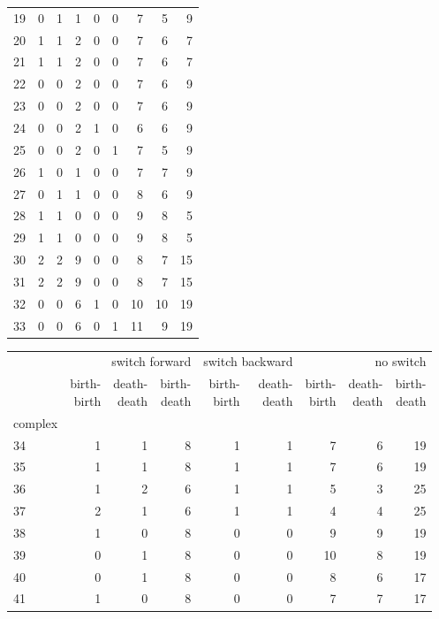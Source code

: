 \documentclass{article}
\begin{document}
\begin{center}
\begin{tabular}{lrrrrrrrr}
19 & 0 & 1 & 1 & 0 & 0 & 7 & 5 & 9 \\
20 & 1 & 1 & 2 & 0 & 0 & 7 & 6 & 7 \\
21 & 1 & 1 & 2 & 0 & 0 & 7 & 6 & 7 \\
22 & 0 & 0 & 2 & 0 & 0 & 7 & 6 & 9 \\
23 & 0 & 0 & 2 & 0 & 0 & 7 & 6 & 9 \\
24 & 0 & 0 & 2 & 1 & 0 & 6 & 6 & 9 \\
25 & 0 & 0 & 2 & 0 & 1 & 7 & 5 & 9 \\
26 & 1 & 0 & 1 & 0 & 0 & 7 & 7 & 9 \\
27 & 0 & 1 & 1 & 0 & 0 & 8 & 6 & 9 \\
28 & 1 & 1 & 0 & 0 & 0 & 9 & 8 & 5 \\
29 & 1 & 1 & 0 & 0 & 0 & 9 & 8 & 5 \\
30 & 2 & 2 & 9 & 0 & 0 & 8 & 7 & 15 \\
31 & 2 & 2 & 9 & 0 & 0 & 8 & 7 & 15 \\
32 & 0 & 0 & 6 & 1 & 0 & 10 & 10 & 19 \\
33 & 0 & 0 & 6 & 0 & 1 & 11 & 9 & 19 \\
\bottomrule
\end{tabular}

\begin{tabular}{lrrrrrrrr}
\toprule
& \multicolumn{3}{r}{switch forward} & \multicolumn{2}{r}{switch backward} & \multicolumn{3}{r}{no switch} \\
& \makecell{birth-\\birth} & \makecell{death-\\death} & \makecell{birth-\\death} & \makecell{birth-\\birth} & \makecell{death-\\death} & \makecell{birth-\\birth} & \makecell{death-\\death} & \makecell{birth-\\death} \\
complex &  &  &  &  &  &  &  &  \\
\midrule
34 & 1 & 1 & 8 & 1 & 1 & 7 & 6 & 19 \\
35 & 1 & 1 & 8 & 1 & 1 & 7 & 6 & 19 \\
36 & 1 & 2 & 6 & 1 & 1 & 5 & 3 & 25 \\
37 & 2 & 1 & 6 & 1 & 1 & 4 & 4 & 25 \\
38 & 1 & 0 & 8 & 0 & 0 & 9 & 9 & 19 \\
39 & 0 & 1 & 8 & 0 & 0 & 10 & 8 & 19 \\
40 & 0 & 1 & 8 & 0 & 0 & 8 & 6 & 17 \\
41 & 1 & 0 & 8 & 0 & 0 & 7 & 7 & 17 \\
\bottomrule
\end{tabular}

\end{center}
\end{document}
